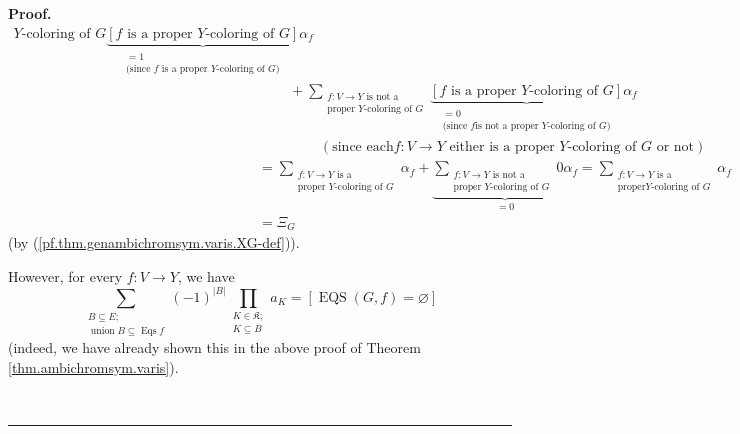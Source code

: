 \documentclass[numbers=enddot,12pt,final,onecolumn,notitlepage]{scrartcl}%
\theoremstyle{definition}
\newenvironment{proof}[1][Proof]{\noindent\textbf{#1.} }{\ \rule{0.5em}{0.5em}}
\newenvironment{verlong}{}{}
\let\sumnonlimits\sum
\let\prodnonlimits\prod
\renewcommand{\sum}{\sumnonlimits\limits}
\renewcommand{\prod}{\prodnonlimits\limits}
\begin{document}
\begin{verlong}
\begin{proof}
\begin{align}
{{Y\text{-coloring of }G}}\underbrace{\left[  f\text{ is a proper }%
Y\text{-coloring of }G\right]  }_{\substack{=1\\\text{(since }f\text{ is a
proper }Y\text{-coloring of }G\text{)}}}\alpha_{f}\nonumber\\
&  \ \ \ \ \ \ \ \ \ \ +\sum_{\substack{f:V\rightarrow Y\text{ is not
a}\\\text{proper }Y\text{-coloring of }G}}\underbrace{\left[  f\text{ is a
proper }Y\text{-coloring of }G\right]  }_{\substack{=0\\\text{(since }f\text{
is not a proper }Y\text{-coloring of }G\text{)}}}\alpha_{f}\nonumber\\
&  \ \ \ \ \ \ \ \ \ \ \ \ \ \ \ \ \ \ \ \ \left(  \text{since each
}f:V\rightarrow Y\text{ either is a proper }Y\text{-coloring of }G\text{ or
not}\right) \nonumber\\
&  =\sum_{\substack{f:V\rightarrow Y\text{ is a}\\\text{proper }%
Y\text{-coloring of }G}}\alpha_{f}+\underbrace{\sum_{\substack{f:V\rightarrow
Y\text{ is not a}\\\text{proper }Y\text{-coloring of }G}}0\alpha_{f}}%
_{=0}=\sum_{\substack{f:V\rightarrow Y\text{ is a}\\\text{proper
}Y\text{-coloring of }G}}\alpha_{f}\nonumber\\
&  =\Xi_{G} \label{pf.thm.genambichromsym.varis.step1}%
\end{align}
(by (\ref{pf.thm.genambichromsym.varis.XG-def})).

However, for every $f:V\rightarrow Y$, we have%
\begin{equation}
\sum_{\substack{B\subseteq E;\\\operatorname*{union}B\subseteq
\operatorname*{Eqs}f}}\left(  -1\right)  ^{\left\vert B\right\vert }%
\prod_{\substack{K\in\mathfrak{K};\\K\subseteq B}}a_{K}=\left[
\operatorname*{EQS}\left(  G,f\right)  =\varnothing\right]
\label{pf.thm.genambichromsym.varis.moeb2}%
\end{equation}
(indeed, we have already shown this in the above proof of Theorem
\ref{thm.ambichromsym.varis}).


\end{proof}
\end{verlong}
\end{document}
